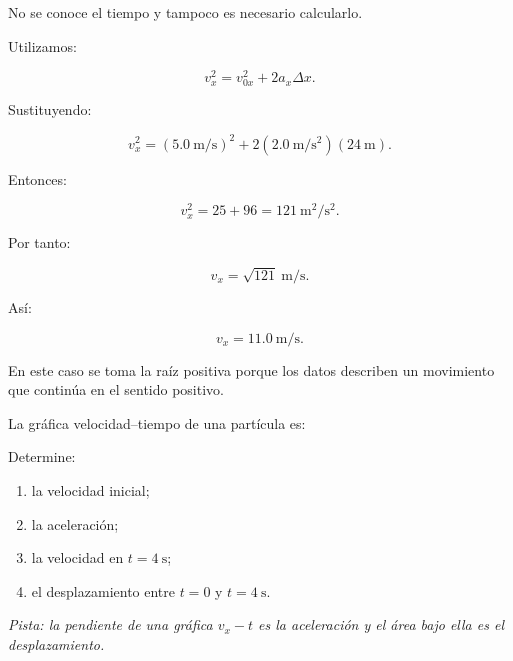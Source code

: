 \begin{explicacion}
No se conoce el tiempo y tampoco es necesario calcularlo.

Utilizamos:

\[ v_x^2=v_{0x}^2+2a_x\Delta x. \]

Sustituyendo:

\[
v_x^2
=
(\SI{5.0}{\meter\per\second})^2
+
2
(\SI{2.0}{\meter\per\second\squared})
(\SI{24}{\meter}).
\]

Entonces:

\[
v_x^2
=
25+96
=
121\ \si{\meter\squared\per\second\squared}.
\]

Por tanto:

\[ v_x=\sqrt{121}\ \si{\meter\per\second}. \]

Así:

\[ \boxed{v_x=\SI{11.0}{\meter\per\second}}. \]

En este caso se toma la raíz positiva porque los datos describen un movimiento que continúa en el sentido positivo.
\end{explicacion}


\begin{ejercicio}
La gráfica velocidad--tiempo de una partícula es:

\begin{center}
\end{center}

Determine:

\begin{enumerate}[label=\alph*)]
    \item la velocidad inicial;
    \item la aceleración;
    \item la velocidad en \(t=\SI{4}{\second}\);
    \item el desplazamiento entre \(t=0\) y \(t=\SI{4}{\second}\).
\end{enumerate}

\textit{Pista: la pendiente de una gráfica \(v_x-t\) es la aceleración y el área bajo ella es el desplazamiento.}
\end{ejercicio}

